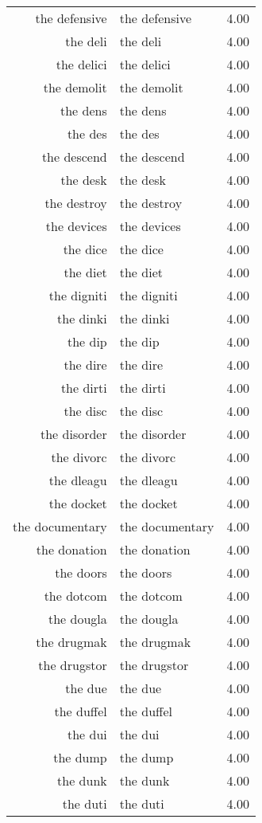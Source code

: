 \begin{table}[ht]
\begin{tabular}{rlr}
  the defensive & the defensive & 4.00 \\ 
  the deli & the deli & 4.00 \\ 
  the delici & the delici & 4.00 \\ 
  the demolit & the demolit & 4.00 \\ 
  the dens & the dens & 4.00 \\ 
  the des & the des & 4.00 \\ 
  the descend & the descend & 4.00 \\ 
  the desk & the desk & 4.00 \\ 
  the destroy & the destroy & 4.00 \\ 
  the devices & the devices & 4.00 \\ 
  the dice & the dice & 4.00 \\ 
  the diet & the diet & 4.00 \\ 
  the digniti & the digniti & 4.00 \\ 
  the dinki & the dinki & 4.00 \\ 
  the dip & the dip & 4.00 \\ 
  the dire & the dire & 4.00 \\ 
  the dirti & the dirti & 4.00 \\ 
  the disc & the disc & 4.00 \\ 
  the disorder & the disorder & 4.00 \\ 
  the divorc & the divorc & 4.00 \\ 
  the dleagu & the dleagu & 4.00 \\ 
  the docket & the docket & 4.00 \\ 
  the documentary & the documentary & 4.00 \\ 
  the donation & the donation & 4.00 \\ 
  the doors & the doors & 4.00 \\ 
  the dotcom & the dotcom & 4.00 \\ 
  the dougla & the dougla & 4.00 \\ 
  the drugmak & the drugmak & 4.00 \\ 
  the drugstor & the drugstor & 4.00 \\ 
  the due & the due & 4.00 \\ 
  the duffel & the duffel & 4.00 \\ 
  the dui & the dui & 4.00 \\ 
  the dump & the dump & 4.00 \\ 
  the dunk & the dunk & 4.00 \\ 
  the duti & the duti & 4.00 \\ 

\end{tabular}
\end{table}
